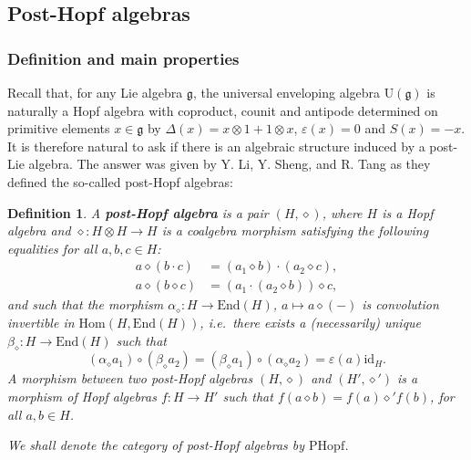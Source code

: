 \documentclass[10pt]{article}
\newtheorem {definition}[lemma] {Definition}
\theoremstyle{definition}
\renewcommand{\wp}{\diamond}
\newcommand{\ot}{\otimes}
\begin{document}
\subsection{Post-Hopf algebras}

\subsubsection{Definition and main properties}

Recall that, for any Lie algebra $\mathfrak{g}$, the universal enveloping algebra $\mathrm{U}(\mathfrak{g})$ is naturally a Hopf algebra with coproduct, counit and antipode determined on primitive elements $x\in\mathfrak{g}$ by $\Delta(x)=x\otimes 1+1\otimes x$, $\varepsilon(x)=0$ and $S(x)=-x$. It is therefore natural to ask if there is an algebraic structure induced by a post-Lie algebra. The answer was given by Y. Li, Y. Sheng, and R. Tang \cite{LST} as they defined the so-called post-Hopf algebras:

\begin{definition}\label{def:PH}
A \textbf{post-Hopf algebra} is a pair $(H,\wp)$, where $H$ is a Hopf algebra and $\wp:H\ot H\to H$ is a coalgebra morphism satisfying the following equalities for all $a,b,c \in H$:
\begin{align}
a\wp(b\cdot c)&=(a_{1}\wp b)\cdot(a_{2}\wp c)\label{wpproduct},\\
a\wp(b\wp c)&=(a_{1}\cdot(a_{2}\wp b))\wp c\label{wpdefassoci},
\end{align}
and such that the morphism $\alpha_{\wp}:H\to\mathrm{End}(H)$, $a\mapsto a\wp(-)$ is convolution invertible in $\mathrm{Hom}(H,\mathrm{End}(H))$, i.e.\ there exists a (necessarily) unique $\beta_{\wp}:H\to\mathrm{End}(H)$ such that 
\[
(\alpha_{\wp}a_{1})\circ(\beta_{\wp}a_{2})=(\beta_{\wp}a_{1})\circ(\alpha_{\wp}a_{2})=\varepsilon(a)\mathrm{id}_{H}.
\]
A morphism between two post-Hopf algebras $(H,\wp)$ and $(H',\wp')$ is a morphism of Hopf algebras $f:H\to H'$ such that $f(a\wp b)=f(a)\wp'f(b)$, for all $a,b\in H$. 

We shall denote the category of post-Hopf algebras by $\mathrm{PHopf}$.
\end{definition}
\end{document}
